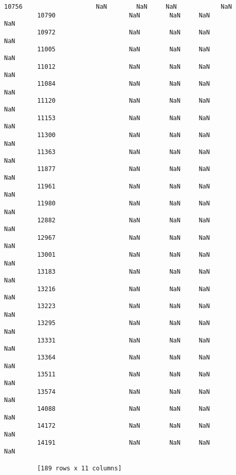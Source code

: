 \documentclass[11pt]{article}
\begin{document}
\begin{Verbatim}[commandchars=\\\{\}]
         10756                    NaN        NaN     NaN            NaN  
         10790                    NaN        NaN     NaN            NaN  
         10972                    NaN        NaN     NaN            NaN  
         11005                    NaN        NaN     NaN            NaN  
         11012                    NaN        NaN     NaN            NaN  
         11084                    NaN        NaN     NaN            NaN  
         11120                    NaN        NaN     NaN            NaN  
         11153                    NaN        NaN     NaN            NaN  
         11300                    NaN        NaN     NaN            NaN  
         11363                    NaN        NaN     NaN            NaN  
         11877                    NaN        NaN     NaN            NaN  
         11961                    NaN        NaN     NaN            NaN  
         11980                    NaN        NaN     NaN            NaN  
         12882                    NaN        NaN     NaN            NaN  
         12967                    NaN        NaN     NaN            NaN  
         13001                    NaN        NaN     NaN            NaN  
         13183                    NaN        NaN     NaN            NaN  
         13216                    NaN        NaN     NaN            NaN  
         13223                    NaN        NaN     NaN            NaN  
         13295                    NaN        NaN     NaN            NaN  
         13331                    NaN        NaN     NaN            NaN  
         13364                    NaN        NaN     NaN            NaN  
         13511                    NaN        NaN     NaN            NaN  
         13574                    NaN        NaN     NaN            NaN  
         14088                    NaN        NaN     NaN            NaN  
         14172                    NaN        NaN     NaN            NaN  
         14191                    NaN        NaN     NaN            NaN  
         
         [189 rows x 11 columns]
\end{Verbatim}
            

    
    
    
    
\end{document}
